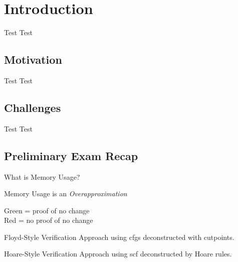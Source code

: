 \section{Introduction}
\begin{frame}{Test}
  Test
\end{frame}


\subsection{Motivation}
\begin{frame}{Test}
  Test
\end{frame}


\subsection{Challenges}
\begin{frame}{Test}
  Test
\end{frame}


\subsection{Preliminary Exam Recap}
\begin{frame}{What is Memory Usage?}
\end{frame}

\begin{frame}{Memory Usage is an \emph{Overapproximation}}
  \centering

  Green = proof of no change \\
  Red = no proof of no change
\end{frame}

\begin{frame}{Floyd-Style Verification}
  Approach using \alert{\glspl{cfg}} deconstructed with \alert{cutpoints}.
\end{frame}

\begin{frame}{Hoare-Style Verification}
  Approach using \alert{\gls{scf}} deconstructed by \alert{Hoare rules}.
\end{frame}
